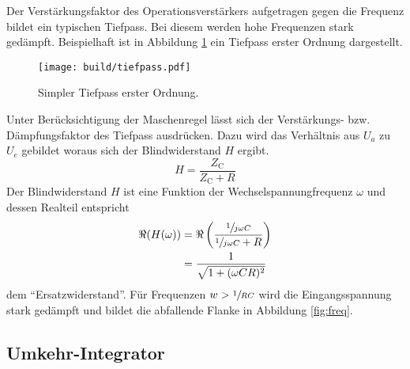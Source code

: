 Der Verstärkungsfaktor des Operationsverstärkers aufgetragen gegen die Frequenz bildet ein typischen Tiefpass.
Bei diesem werden hohe Frequenzen stark gedämpft.
Beispielhaft ist in Abbildung \ref{fig:tiefpass} ein Tiefpass erster Ordnung
dargestellt.
\begin{figure}[h]
		\centering
		\texttt{[image: build/tiefpass.pdf]}
		\caption{Simpler Tiefpass erster Ordnung. \cite{wiki}}
		\label{fig:tiefpass}
\end{figure}
Unter Berücksichtigung der Maschenregel lässt sich der Verstärkungs- bzw.
Dämpfungsfaktor des Tiefpass ausdrücken.
Dazu wird das Verhältnis aus $U_a$ zu $U_e$ gebildet woraus sich der
Blindwiderstand $H$ ergibt.
\begin{equation}
		\label{eq:blindwiederstand}
		H = \frac{Z_\text{C}}{Z_\text{C} + R}
\end{equation}
Der Blindwiderstand $H$ ist eine Funktion der Wechselspannungfrequenz $\omega$
und dessen Realteil entspricht
\begin{align}
		\Re(H(\omega))  &= \Re \left(\frac{\sfrac{1}{j \omega C}}{\sfrac{1}{j\omega
		C} + R} \right) \nonumber \\
    &= \frac{1}{\sqrt{1 + (\omega CR)^2}} \label{eq:tiefpass}
\end{align}
dem \enquote{Ersatzwiderstand}.
Für Frequenzen $w > \sfrac{1}{RC}$ wird die Eingangsspannung stark gedämpft und bildet
die abfallende Flanke in Abbildung \ref{fig:freq}.

\subsection{Umkehr-Integrator}%
\label{sub:umkehr_integrator}

